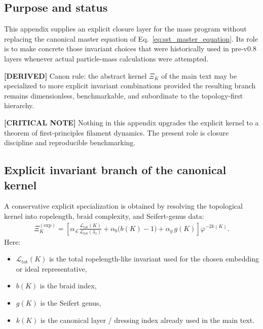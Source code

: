 \documentclass[11pt]{article}
\theoremstyle{definition}
\theoremstyle{plain}
\theoremstyle{remark}
\begin{document}
    \subsection{Purpose and status}
        This appendix supplies an explicit closure layer for the mass program without replacing the canonical master equation of Eq.~\eqref{eq:sst_master_equation}. Its role is to make concrete those invariant choices that were historically used in pre-v0.8 layers whenever actual particle-mass calculations were attempted.
        
        \textbf{[DERIVED]} Canon rule: the abstract kernel \(\Xi_K\) of the main text may be specialized to more explicit invariant combinations provided the resulting branch remains dimensionless, benchmarkable, and subordinate to the topology-first hierarchy.
        
        \textbf{[CRITICAL NOTE]} Nothing in this appendix upgrades the explicit kernel to a theorem of first-principles filament dynamics. The present role is closure discipline and reproducible benchmarking.
    
    \subsection{Explicit invariant branch of the canonical kernel}
        A conservative explicit specialization is obtained by resolving the topological kernel into ropelength, braid complexity, and Seifert-genus data:
        \begin{align}
            \Xi_K^{(\mathrm{exp})}
            =
            \left[
                \alpha_{\mathcal{L}}
                \frac{\mathcal{L}_{\mathrm{tot}}(K)}{\mathcal{L}_{\mathrm{tot}}(3_1)}
                +
                \alpha_b \bigl(b(K)-1\bigr)
            +
                \alpha_g\, g(K)
            \right]
            \varphi^{-2k(K)}.
            \label{eq:explicit_kernel}
        \end{align}
        Here:
        \begin{itemize}
            \item \(\mathcal{L}_{\mathrm{tot}}(K)\) is the total ropelength-like invariant used for the chosen embedding or ideal representative,
            \item \(b(K)\) is the braid index,
            \item \(g(K)\) is the Seifert genus,
            \item \(k(K)\) is the canonical layer / dressing index already used in the main text.
        \end{itemize}
        
\end{document}
